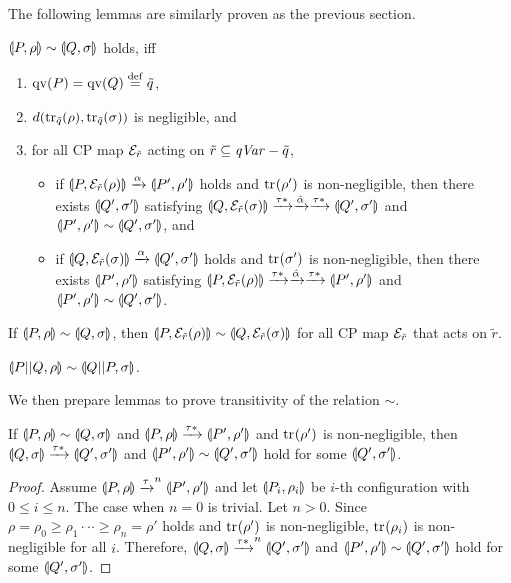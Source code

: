 The following lemmas are similarly proven as the previous section.
\begin{lem}
\label{neg:coinduction}
$\con{P}{\rho} \sim \con{Q}{\sigma}$ holds,
 iff
 \begin{enumerate}
  \item $\qv{P} = \qv{Q} \defeq \tilde q$,
  \item $d(\tr{\tilde q}{\rho}, \tr{\tilde q}{\sigma})$
	is negligible, and
  \item for all CP map $\E_{\tilde r}$ acting
	on $\tilde r \subseteq \sfqv - \tilde q$,
	\begin{itemize}
	 \item if $\con{P}{\E_{\tilde r}(\rho)} \xrightarrow{\alpha}
	       \con{P'}{\rho'}$ holds and $\tr{}{\rho'}$ is
	       non-negligible, then
	       there exists $\con{Q'}{\sigma'}$ satisfying
	       $\con{Q}{\E_{\tilde r}(\sigma)} \weak{\hat \alpha}
	       \con{Q'}{\sigma'}$ and
	       $\con{P'}{\rho'} \sim \con{Q'}{\sigma'}$,
	       and
	 \item if $\con{Q}{\E_{\tilde r}(\sigma)} \xrightarrow{\alpha}
	       \con{Q'}{\sigma'}$ holds and $\tr{}{\sigma'}$ is
	       non-negligible, then
	       there exists $\con{P'}{\rho'}$ satisfying
	       $\con{P}{\E_{\tilde r}(\rho)} \weak{\hat \alpha}
	       \con{P'}{\rho'}$ and 
	       $\con{P'}{\rho'} \sim \con{Q'}{\sigma'}$.
	\end{itemize}
 \end{enumerate}
\end{lem}
\begin{lem}\label{neg:soclosed}
 If $\con{P}{\rho} \sim \con{Q}{\sigma}$, then 
 $\con{P}{\E_{\tilde r}(\rho)} \sim \con{Q}{\E_{\tilde r}(\sigma)}$
 for all CP map $\E_{\tilde r}$ that acts on $\tilde r$. 
\end{lem}
\begin{prop}
\label{neg:sym-by-par}
 $\con{P||Q}{\rho} \sim \con{Q||P}{\sigma}$.
\end{prop}

We then prepare lemmas to prove transitivity of the relation
$\sim$.
\begin{lem}
\label{neg:weaksimulated}
 If $\con{P}{\rho} \sim \con{Q}{\sigma}$ and 
$\con{P}{\rho} \xrightarrow{\tau\ast} \con{P'}{\rho'}$ and
 $\tr{}{\rho'}$ is non-negligible, then
$\con{Q}{\sigma} \xrightarrow{\tau\ast}
 \con{Q'}{\sigma'}$ and $\con{P'}{\rho'} \sim \con{Q'}{\sigma'}$ hold
 for some $\con{Q'}{\sigma'}$.
\end{lem}
\begin{proof}
 Assume $\con{P}{\rho} \xrightarrow{\tau}^n \con{P'}{\rho'}$
 and let $\con{P_i}{\rho_i}$ be $i$-th configuration with $0 \le i \le
 n$. The case when $n = 0$ is trivial. Let $n > 0$.
 Since $\rho = \rho_0 \ge \rho_1 \cdot\cdot\cdot \ge \rho_n =
 \rho'$ holds and $\tr{}{\rho'}$ is non-negligible, 
 $\tr{}{\rho_i}$ is non-negligible for all $i$. Therefore,
 $\con{Q}{\sigma} \xrightarrow{\tau\ast}^n
 \con{Q'}{\sigma'}$ and $\con{P'}{\rho'} \sim \con{Q'}{\sigma'}$ hold
 for some $\con{Q'}{\sigma'}$.
\end{proof}

